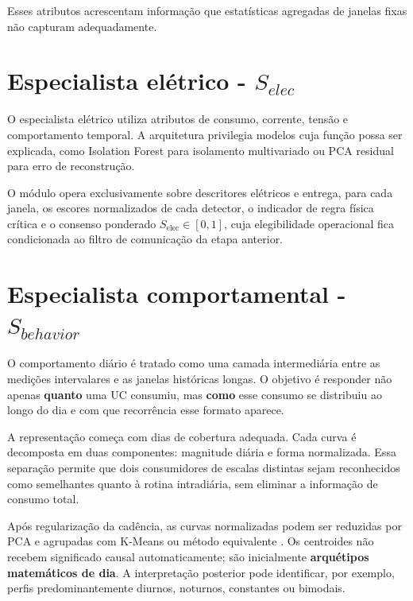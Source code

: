Esses atributos acrescentam informação que estatísticas agregadas de janelas fixas não capturam adequadamente.

\section{\texorpdfstring{Especialista elétrico - \(S_{elec}\)}{Especialista elétrico - S\_\{elec\}}}\label{especialista-eluxe9trico---s_elec}

O especialista elétrico utiliza atributos de consumo, corrente, tensão e comportamento temporal. A arquitetura privilegia modelos cuja função possa ser explicada, como Isolation Forest para isolamento multivariado ou PCA residual para erro de reconstrução.

O módulo opera exclusivamente sobre descritores elétricos e entrega, para cada janela, os escores normalizados de cada detector, o indicador de regra física crítica e o consenso ponderado $S_{\text{elec}} \in [0,1]$, cuja elegibilidade operacional fica condicionada ao filtro de comunicação da etapa anterior.

\section{\texorpdfstring{Especialista comportamental - \(S_{behavior}\)}{Especialista comportamental - S\_\{behavior\}}}\label{especialista-comportamental---s_behavior}

O comportamento diário é tratado como uma camada intermediária entre as medições intervalares e as janelas históricas longas. O objetivo é responder não apenas \textbf{quanto} uma UC consumiu, mas \textbf{como} esse consumo se distribuiu ao longo do dia e com que recorrência esse formato aparece.

A representação começa com dias de cobertura adequada. Cada curva é decomposta em duas componentes: magnitude diária e forma normalizada. Essa separação permite que dois consumidores de escalas distintas sejam reconhecidos como semelhantes quanto à rotina intradiária, sem eliminar a informação de consumo total.

Após regularização da cadência, as curvas normalizadas podem ser reduzidas por PCA \autocite{jolliffe2002} e agrupadas com K-Means \autocite{macqueen1967} ou método equivalente \autocite{geron2025}. Os centroides não recebem significado causal automaticamente; são inicialmente \textbf{arquétipos matemáticos de dia}. A interpretação posterior pode identificar, por exemplo, perfis predominantemente diurnos, noturnos, constantes ou bimodais.

